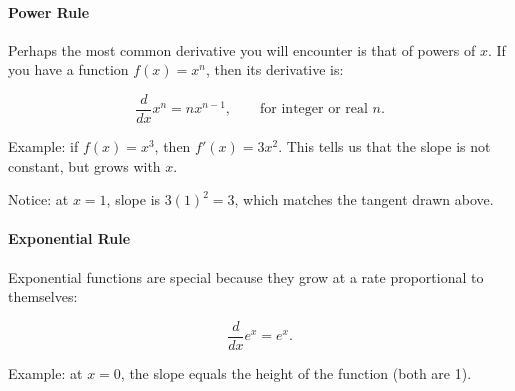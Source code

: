 \documentclass[11pt,letterpaper]{article}
\begin{document}
\paragraph{Power Rule} 
Perhaps the most common derivative you will encounter is that of powers of $x$. If you have a function $f(x) = x^n$, then its derivative is:

\begin{equation*}
    \frac{d}{dx} x^n = n x^{n-1}, \qquad \text{for integer or real } n.
\end{equation*}

\noindent Example: if $f(x) = x^3$, then $f'(x) = 3x^2$.  This tells us that the slope is not constant, but grows with $x$. 

\begin{center}
\end{center}

Notice: at $x=1$, slope is $3(1)^2 = 3$, which matches the tangent drawn above.  

\paragraph{Exponential Rule}
Exponential functions are special because they grow at a rate proportional to themselves:

\begin{equation*}
    \frac{d}{dx} e^x = e^x.
\end{equation*}

\noindent Example: at $x=0$, the slope equals the height of the function (both are 1).

\begin{center}
\end{center}
\end{document}
